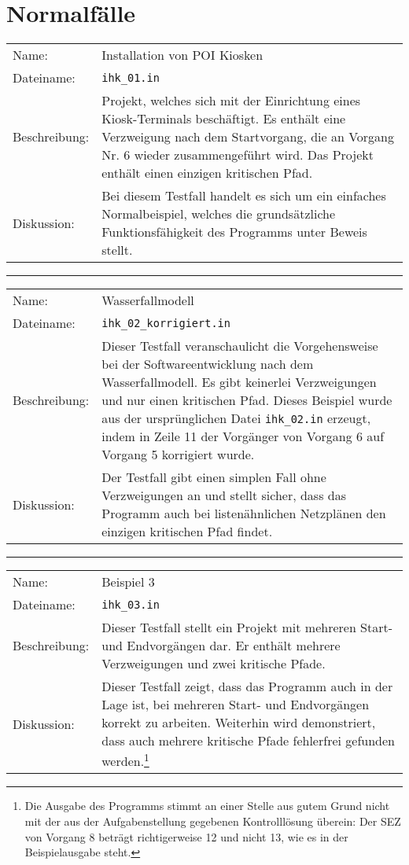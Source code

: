 \section{Normalf\"alle}
\begin{tabularx}{\textwidth}{l X}
  Name: & Installation von POI Kiosken \\
  Dateiname: & \texttt{ihk\_01.in} \\
  Beschreibung: & Projekt, welches sich mit der Einrichtung eines
  Kiosk-Terminals besch\"aftigt. Es enth\"alt eine Verzweigung nach
  dem Startvorgang, die an Vorgang Nr. 6 wieder zusammengef\"uhrt
  wird. Das Projekt enth\"alt einen einzigen kritischen Pfad. \\
  Diskussion: & Bei diesem Testfall handelt es sich um ein einfaches
  Normalbeispiel, welches die grunds\"atzliche
  Funktionsf\"ahigkeit des Programms unter Beweis stellt. \\
\end{tabularx}
\hrule
\begin{tabularx}{\textwidth}{l X}
  Name: & Wasserfallmodell \\
  Dateiname: & \texttt{ihk\_02\_korrigiert.in} \\
  Beschreibung: & Dieser Testfall veranschaulicht die Vorgehensweise
  bei der Softwareentwicklung nach dem Wasserfallmodell. Es gibt
  keinerlei Verzweigungen und nur einen kritischen Pfad. Dieses
  Beispiel wurde aus der urspr\"unglichen Datei \texttt{ihk\_02.in}
  erzeugt, indem in Zeile 11 der Vorg\"anger von Vorgang 6 auf Vorgang
  5 korrigiert wurde.\\
  Diskussion: & Der Testfall gibt einen simplen Fall ohne
  Verzweigungen an und stellt sicher, dass das Programm auch bei
  listen\"ahnlichen Netzpl\"anen den einzigen kritischen Pfad
  findet.\\
\end{tabularx}
\hrule
\begin{tabularx}{\textwidth}{l X}
  Name: & Beispiel 3 \\
  Dateiname: & \texttt{ihk\_03.in} \\
  Beschreibung: & Dieser Testfall stellt ein Projekt mit mehreren
  Start- und Endvorg\"angen dar. Er enth\"alt mehrere Verzweigungen
  und zwei kritische Pfade.\\
  Diskussion: & Dieser Testfall zeigt, dass das Programm auch in der
  Lage ist, bei mehreren Start- und Endvorg\"angen korrekt zu
  arbeiten. Weiterhin wird demonstriert, dass auch mehrere kritische
  Pfade fehlerfrei gefunden werden.\footnote{Die Ausgabe des Programms
  stimmt an einer Stelle aus gutem Grund nicht mit der aus der
  Aufgabenstellung gegebenen Kontrolll\"osung \"uberein: Der SEZ von
  Vorgang 8 betr\"agt richtigerweise 12 und nicht 13, wie es in der
  Beispielausgabe steht.}\\
\end{tabularx}
